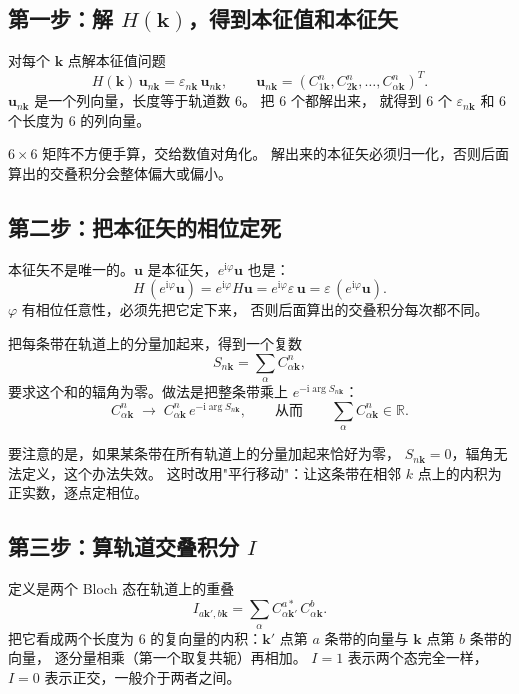 \documentclass[11pt,a4paper]{ctexart}
\newcommand{\kk}{\mathbf{k}}
\newcommand{\kq}{\mathbf{k}'}
\newcommand{\eps}{\varepsilon}
\newcommand{\ii}{\mathrm{i}}
\begin{document}
\subsection{第一步：解 $H(\kk)$，得到本征值和本征矢}

对每个 $\kk$ 点解本征值问题
\begin{equation}
H(\kk)\,\mathbf u_{n\kk}=\eps_{n\kk}\,\mathbf u_{n\kk},
\qquad
\mathbf u_{n\kk}=\left(C^{n}_{1\kk},C^{n}_{2\kk},\dots,C^{n}_{\alpha\kk}\right)^{T}.
\label{eq:eig}
\end{equation}
$\mathbf u_{n\kk}$ 是一个列向量，长度等于轨道数 6。
把 $6$ 个都解出来， 就得到 $6$ 个 $\eps_{n\kk}$ 和 $6$ 个长度为 6 的列向量。

$6\times6$ 矩阵不方便手算，交给数值对角化。
解出来的本征矢必须归一化，否则后面算出的交叠积分会整体偏大或偏小。

\subsection{第二步：把本征矢的相位定死}

本征矢不是唯一的。$\mathbf u$ 是本征矢，$e^{\ii\varphi}\mathbf u$ 也是：
\begin{equation*}
H\,(e^{\ii\varphi}\mathbf u)=e^{\ii\varphi}H\mathbf u
=e^{\ii\varphi}\eps\,\mathbf u=\eps\,(e^{\ii\varphi}\mathbf u).
\end{equation*}
$\varphi$ 有相位任意性，必须先把它定下来， 否则后面算出的交叠积分每次都不同。

把每条带在轨道上的分量加起来，得到一个复数
\begin{equation}
S_{n\kk}=\sum_{\alpha}C^{n}_{\alpha\kk},
\label{eq:S}
\end{equation}
要求这个和的辐角为零。做法是把整条带乘上 $e^{-\ii\arg S_{n\kk}}$：
\begin{equation}
C^{n}_{\alpha\kk}\;\longrightarrow\;C^{n}_{\alpha\kk}\,e^{-\ii\arg S_{n\kk}},
\qquad\text{从而}\qquad
\sum_{\alpha}C^{n}_{\alpha\kk}\in\mathbb{R}.
\label{eq:gauge}
\end{equation}

要注意的是，如果某条带在所有轨道上的分量加起来恰好为零，
$S_{n\kk}=0$，辐角无法定义，这个办法失效。
这时改用"平行移动"：让这条带在相邻 $k$ 点上的内积为正实数，逐点定相位。

\subsection{第三步：算轨道交叠积分 $I$}

定义是两个 Bloch 态在轨道上的重叠
\begin{equation}
I_{a\kq,b\kk}=\sum_{\alpha}C^{a*}_{\alpha\kq}\,C^{b}_{\alpha\kk}.
\label{eq:overlap}
\end{equation}
把它看成两个长度为 6 的复向量的内积：$\kq$ 点第 $a$ 条带的向量与 $\kk$ 点第 $b$ 条带的向量，
逐分量相乘（第一个取复共轭）再相加。
$I=1$ 表示两个态完全一样，$I=0$ 表示正交，一般介于两者之间。
\end{document}
